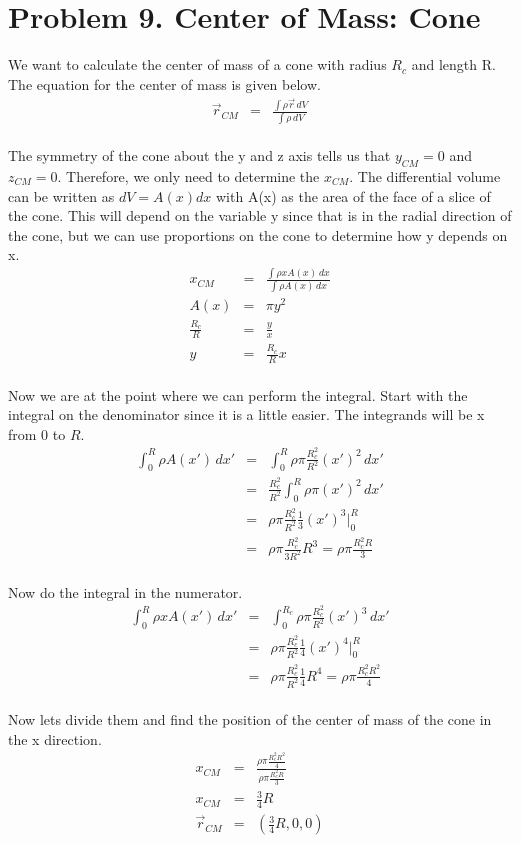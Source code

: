 \documentclass[11pt]{article}
\begin{document}
\section*{Problem 9. Center of Mass: Cone}

We want to calculate the center of mass of a cone with radius $R_{c}$ and length R. The equation for the center of mass is given below. \\ 
\begin{eqnarray*} 
\vec{r}_{CM} &=& \frac{\int{\rho}\vec{r}\,dV}{\int{\rho}\,dV} 
\end{eqnarray*} \\
The symmetry of the cone about the y and z axis tells us that $y_{CM}=0$ and $z_{CM}=0$. Therefore, we only need to determine the $x_{CM}$. The differential volume can be written as $dV=A(x)dx$ with A(x) as the area of the face of a slice of the cone. This will depend on the variable y since that is in the radial direction of the cone, but we can use proportions on the cone to determine how y depends on x. \\
\begin{eqnarray*} 
x_{CM} &=& \frac{\int{\rho}xA(x)\,dx}{\int{\rho}A(x)\,dx} \\
A(x) &=& \pi{y^{2}} \\
\frac{R_{c}}{R} &=& \frac{y}{x} \\
y &=& \frac{R_{c}}{R}x 
\end{eqnarray*} \\
Now we are at the point where we can perform the integral. Start with the integral on the denominator since it is a little easier. The integrands will be x from 0 to $R$. \\
\begin{eqnarray*} 
\int_{0}^{R}\rho{}A(x')\,dx' &=& \int_{0}^{R}\rho\pi\frac{R_{c}^{2}}{R^{2}}(x')^{2}\,dx' \\
&=& \frac{R_{c}^{2}}{R^{2}}\int_{0}^{R}\rho\pi(x')^{2}\,dx' \\
&=& \rho\pi\frac{R_{c}^{2}}{R^{2}}\frac{1}{3}(x')^{3}|_{0}^{R} \\
&=&\rho\pi\frac{R_{c}^{2}}{3R^{2}}R^{3} = \rho\pi\frac{R_{c}^{2}R}{3} 
\end{eqnarray*} \\
Now do the integral in the numerator. \\ 
\begin{eqnarray*}
\int_{0}^{R}\rho{x}A(x')\,dx' &=& \int_{0}^{R_{c}}\rho\pi\frac{R_{c}^{2}}{R^{2}}(x')^{3}\,dx' \\
&=& \rho\pi\frac{R_{c}^{2}}{R^{2}}\frac{1}{4}(x')^{4}|_{0}^{R} \\
&=&  \rho\pi\frac{R_{c}^{2}}{R^{2}}\frac{1}{4}R^{4} = \rho\pi\frac{R_{c}^{2}R^{2}}{4}
\end{eqnarray*} \\
Now lets divide them and find the position of the center of mass of the cone in the x direction. \\
\begin{eqnarray*}
x_{CM} &=& \frac{\rho\pi\frac{R_{c}^{2}R^{2}}{4}}{\rho\pi\frac{R_{c}^{2}R}{3}} \\
x_{CM} &=&\frac{3}{4}R \\
\vec{r}_{CM} &=& (\frac{3}{4}R, 0, 0) 
\end{eqnarray*} \\
\end{document}
